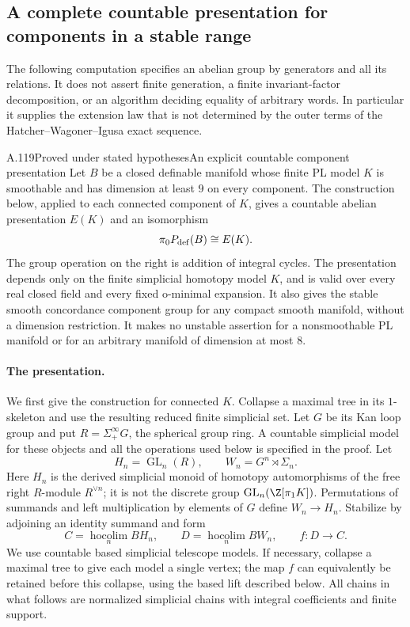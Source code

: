 \subsection{A complete countable presentation for components in a stable range}

The following computation specifies an abelian group by generators and
all its relations. It does not assert finite generation, a finite
invariant-factor decomposition, or an algorithm deciding equality of
arbitrary words. In particular it supplies the extension law that is
not determined by the outer terms of the Hatcher--Wagoner--Igusa exact
sequence.

\begin{saresult}{A.119}{Proved under stated hypotheses}{An explicit countable component presentation}
Let $B$ be a closed definable manifold whose finite PL model $K$ is
smoothable and has dimension at least $9$ on every component. The
construction below, applied to each connected component of $K$, gives
a countable abelian presentation $E(K)$ and an isomorphism
\[
                   \pi_0P_{\rm def}(B)\cong E(K).
\]
The group operation on the right is addition of integral cycles. The
presentation depends only on the finite simplicial homotopy model $K$,
and is valid over every real closed field and every fixed o-minimal
expansion. It also gives the stable smooth concordance component group
for any compact smooth manifold, without a dimension restriction.
It makes no unstable assertion for a nonsmoothable PL manifold or for
an arbitrary manifold of dimension at most $8$.
\end{saresult}

\paragraph{The presentation.}
We first give the construction for connected $K$. Collapse a maximal
tree in its $1$-skeleton and use the resulting reduced finite simplicial
set. Let $G$ be its Kan loop group and put $R=\Sigma^\infty_+G$, the
spherical group ring. A countable simplicial model for these objects
and all the operations used below is specified in the proof.
Let
\[
 H_n=\operatorname{GL}_n(R),\qquad
 W_n=G^n\rtimes\Sigma_n.
\]
Here $H_n$ is the derived simplicial monoid of homotopy automorphisms
of the free right $R$-module $R^{\vee n}$; it is not the discrete
group $\operatorname{GL}_n(\Z[\pi_1K])$. Permutations of summands and
left multiplication by elements of $G$ define $W_n\to H_n$.
Stabilize by adjoining an identity summand and form
\[
       C=\operatorname*{hocolim}_n BH_n,\qquad
       D=\operatorname*{hocolim}_n BW_n,
       \qquad f:D\longrightarrow C.                 \tag{A.119.1}
\]
We use countable based simplicial telescope models. If necessary,
collapse a maximal tree to give each model a single vertex; the map
$f$ can equivalently be retained before this collapse, using the
based lift described below. All chains in what follows are normalized
simplicial chains with integral coefficients and finite support.

